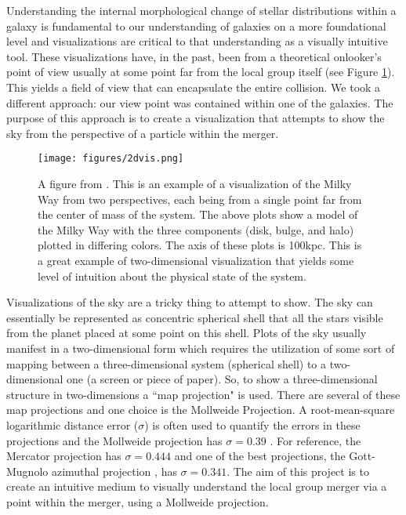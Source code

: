 \documentclass[twocolumn]{aastex63}
\begin{document}
Understanding the internal morphological change of stellar distributions within a galaxy is fundamental to our understanding of galaxies on a more foundational level and visualizations are critical to that understanding as a visually intuitive tool. These visualizations have, in the past, been from a theoretical onlooker's point of view usually at some point far from the local group itself (see Figure \ref{fig:2dvis}). This yields a field of view that can encapsulate the entire collision. We took a different approach: our view point was contained within one of the galaxies. The purpose of this approach is to create a visualization that attempts to show the sky from the perspective of a particle within the merger.

\begin{figure}
    \centering
    \texttt{[image: figures/2dvis.png]}
    \caption{A figure from \cite{2dvis}. This is an example of a visualization of the Milky Way from two perspectives, each being from a single point far from the center of mass of the system. The above plots show a model of the Milky Way with the three components (disk, bulge, and halo) plotted in differing colors. The axis of these plots is 100kpc. This is a great example of two-dimensional visualization that yields some level of intuition about the physical state of the system.}
    \label{fig:2dvis}
\end{figure}

Visualizations of the sky are a tricky thing to attempt to show. The sky can essentially be represented as concentric spherical shell that all the stars visible from the planet placed at some point on this shell. Plots of the sky usually manifest in a two-dimensional form which requires the utilization of some sort of mapping between a three-dimensional system (spherical shell) to a two-dimensional one (a screen or piece of paper). So, to show a three-dimensional structure in two-dimensions a ``map projection" is used. There are several of these map projections and one choice is the Mollweide Projection. A root-mean-square logarithmic distance error ($\sigma$) is often used to quantify the errors in these projections and the Mollweide projection has $\sigma = 0.39$ \citep{gott2006}. For reference, the Mercator projection has $\sigma = 0.444$ and one of the best projections, the Gott-Mugnolo azimuthal projection \citep{gott2006}, has $\sigma = 0.341$. The aim of this project is to create an intuitive medium to visually understand the local group merger via a point within the merger, using a Mollweide projection.
\end{document}
